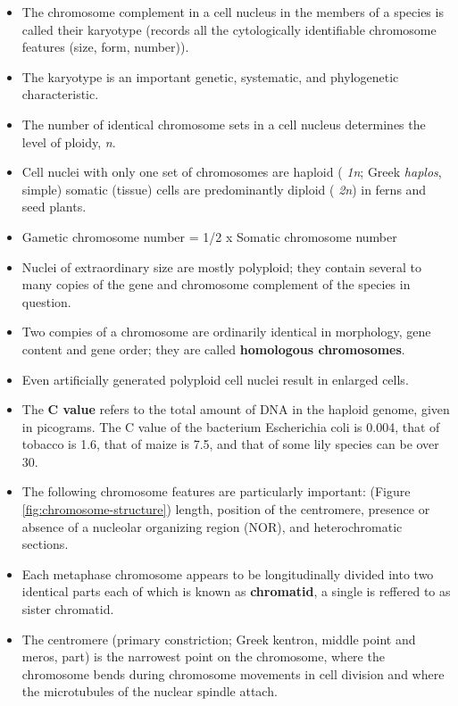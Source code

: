 \documentclass[11pt,ignorenonframetext,aspectratio=169]{beamer}
\providecommand{\tightlist}{%
  \setlength{\itemsep}{0pt}\setlength{\parskip}{0pt}}
\begin{document}
\begin{frame}{}
\protect\hypertarget{section-2}{}
\begin{itemize}
\tightlist
\item
  The chromosome complement in a cell nucleus in the members of a
  species is called their karyotype (records all the cytologically
  identifiable chromosome features (size, form, number)).
\item
  The karyotype is an important genetic, systematic, and phylogenetic
  characteristic.
\item
  The number of identical chromosome sets in a cell nucleus determines
  the level of ploidy, \emph{n}.
\item
  Cell nuclei with only one set of chromosomes are haploid ( \emph{1n};
  Greek \emph{haplos}, simple) somatic (tissue) cells are predominantly
  diploid ( \emph{2n}) in ferns and seed plants.
\item
  Gametic chromosome number = 1/2 x Somatic chromosome number
\item
  Nuclei of extraordinary size are mostly polyploid; they contain
  several to many copies of the gene and chromosome complement of the
  species in question.
\item
  Two compies of a chromosome are ordinarily identical in morphology,
  gene content and gene order; they are called \textbf{homologous
  chromosomes}.
\item
  Even artificially generated polyploid cell nuclei result in enlarged
  cells.
\end{itemize}
\end{frame}

\begin{frame}{}
\protect\hypertarget{section-3}{}
\begin{itemize}
\tightlist
\item
  The \textbf{C value} refers to the total amount of DNA in the haploid
  genome, given in picograms. The C value of the bacterium Escherichia
  coli is 0.004, that of tobacco is 1.6, that of maize is 7.5, and that
  of some lily species can be over 30.
\item
  The following chromosome features are particularly important: (Figure
  \ref{fig:chromosome-structure}) length, position of the centromere,
  presence or absence of a nucleolar organizing region (NOR), and
  heterochromatic sections.
\item
  Each metaphase chromosome appears to be longitudinally divided into
  two identical parts each of which is known as \textbf{chromatid}, a
  single is reffered to as sister chromatid.
\item
  The centromere (primary constriction; Greek kentron, middle point and
  meros, part) is the narrowest point on the chromosome, where the
  chromosome bends during chromosome movements in cell division and
  where the microtubules of the nuclear spindle attach.
\end{itemize}
\end{frame}
\end{document}
